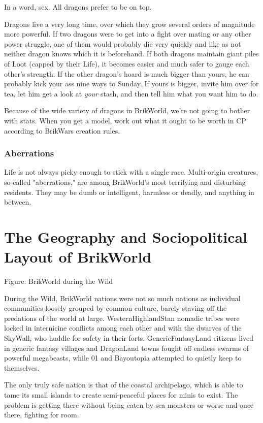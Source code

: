 \documentclass[12pt,a4paper,twocolumn]{article}
\begin{document}
In a word, sex.  All dragons prefer to be on top.

Dragons live a very long time, over which they grow several orders of magnitude more powerful.  If two dragons were to get into a fight over mating or any other power struggle, one of them would probably die very quickly and like as not neither dragon knows which it is beforehand.  If both dragons maintain giant piles of Loot (capped by their Life), it becomes easier and much safer to gauge each other's strength.  If the other dragon's hoard is much bigger than yours, he can probably kick your ass nine ways to Sunday.  If yours is bigger, invite him over for tea, let him get a look at {\it your} stash, and then tell him what you want him to do.

Because of the wide variety of dragons in BrikWorld, we're not going to bother with stats.  When you get a model, work out what it ought to be worth in CP according to BrikWars creation rules.

\subsubsection{Aberrations}

Life is not always picky enough to stick with a single race.  Multi-origin creatures, so-called "aberrations," are among BrikWorld's most terrifying and disturbing residents.  They may be dumb or intelligent, harmless or deadly, and anything in between.

\section{The Geography and Sociopolitical Layout of BrikWorld}

Figure: BrikWorld during the Wild

During the Wild, BrikWorld nations were not so much nations as individual communities loosely grouped by common culture, barely staving off the predations of the world at large.  WesternHighlandStan nomadic tribes were locked in internicine conflicts among each other and with the dwarves of the SkyWall, who huddle for safety in their forts.  GenericFantasyLand citizens lived in generic fantasy villages and DragonLand towns fought off endless swarms of powerful megabeasts, while 01 and Bayoutopia attempted to quietly keep to themselves.

The only truly safe nation is that of the coastal archipelago, which is able to tame its small islands to create semi-peaceful places for minis to exist.  The problem is getting there without being eaten by sea monsters or worse and once there, fighting for room.
\end{document}
